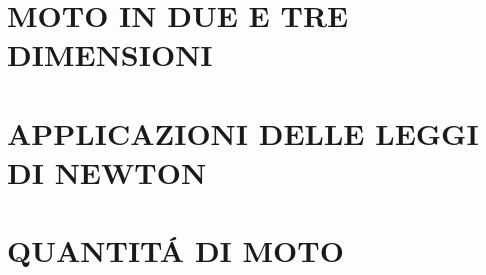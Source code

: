 \documentclass{article}
\begin{document}
	\section{MOTO IN DUE E TRE DIMENSIONI}
		\begin{multicols}{2}
\begin{comment}
			\begin{equation}  \end{equation}
			\begin{equation}  \end{equation}
			\begin{equation}  \end{equation}
			\begin{equation}  \end{equation}
\end{comment}
		\end{multicols}
	\section{APPLICAZIONI DELLE LEGGI DI NEWTON}
		\begin{multicols}{2}
\begin{comment}
			\begin{equation}  \end{equation}
			\begin{equation}  \end{equation}
			\begin{equation}  \end{equation}
			\begin{equation}  \end{equation}
\end{comment}
		\end{multicols}
	\section{QUANTIT\'A DI MOTO}
		\begin{multicols}{2}
\begin{comment}
			\begin{equation}  \end{equation}
			\begin{equation}  \end{equation}
			\begin{equation}  \end{equation}
			\begin{equation}  \end{equation}
\end{comment}
		\end{multicols}
\end{document}
